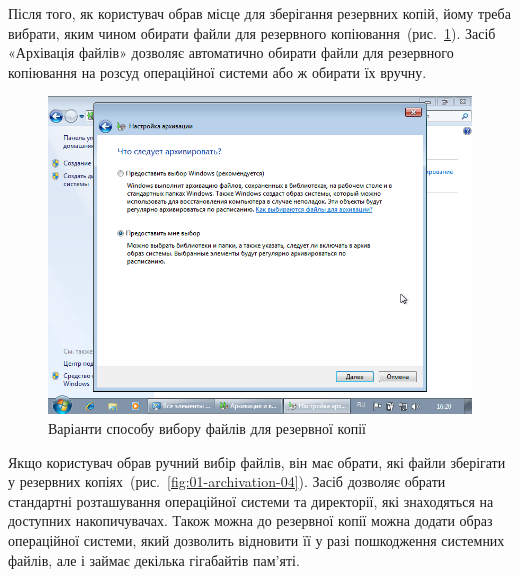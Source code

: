 \documentclass[
	a4paper,
	oneside,
	BCOR = 10mm,
	DIV = 12,
	12pt,
	headings = normal,
]{scrartcl}
\begin{document}
				Після того, як користувач обрав місце для зберігання резервних копій, йому треба вибрати, яким чином обирати файли для резервного копіювання~(рис.~\ref{fig:01-archivation-03}). Засіб «Архівація файлів» дозволяє автоматично обирати файли для резервного копіювання на розсуд операційної системи або ж обирати їх вручну.

				\begin{figure}[!htbp]
					\centering
					\includegraphics[height=12\baselineskip]{./assets/y04s01-infosec-lab-01-03-p03.png}
					\caption{Варіанти способу вибору файлів для резервної копії}
					\label{fig:01-archivation-03}
				\end{figure}

				Якщо користувач обрав ручний вибір файлів, він має обрати, які файли зберігати у резервних копіях~(рис.~\ref{fig:01-archivation-04}). Засіб дозволяє обрати стандартні розташування операційної системи та директорії, які знаходяться на доступних накопичувачах. Також можна до резервної копії можна додати образ операційної системи, який дозволить відновити її у разі пошкодження системних файлів, але і займає декілька гігабайтів пам'яті.
\end{document}
